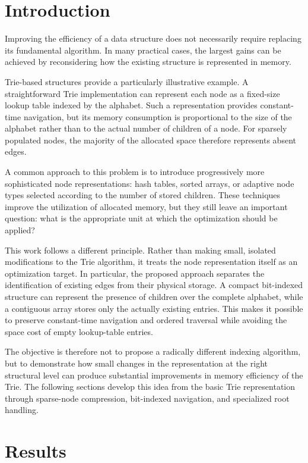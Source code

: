 \documentclass[pdflatex,sn-mathphys-num]{sn-jnl}%
\theoremstyle{thmstyleone}%
\theoremstyle{thmstyletwo}%
\theoremstyle{thmstylethree}%
\begin{document}
\section{Introduction}\label{sec1}


Improving the efficiency of a data structure does not necessarily require replacing its fundamental algorithm. In many practical cases, the largest gains can be achieved by reconsidering how the existing structure is represented in memory.

Trie-based structures provide a particularly illustrative example. A straightforward Trie implementation can represent each node as a fixed-size lookup table indexed by the alphabet. Such a representation provides constant-time navigation, but its memory consumption is proportional to the size of the alphabet rather than to the actual number of children of a node. For sparsely populated nodes, the majority of the allocated space therefore represents absent edges.

A common approach to this problem is to introduce progressively more sophisticated node representations: hash tables, sorted arrays, or adaptive node types selected according to the number of stored children. These techniques improve the utilization of allocated memory, but they still leave an important question: what is the appropriate unit at which the optimization should be applied?

This work follows a different principle. Rather than making small, isolated modifications to the Trie algorithm, it treats the node representation itself as an optimization target. In particular, the proposed approach separates the identification of existing edges from their physical storage. A compact bit-indexed structure can represent the presence of children over the complete alphabet, while a contiguous array stores only the actually existing entries. This makes it possible to preserve constant-time navigation and ordered traversal while avoiding the space cost of empty lookup-table entries.

The objective is therefore not to propose a radically different indexing algorithm, but to demonstrate how small changes in the representation at the right structural level can produce substantial improvements in memory efficiency of the Trie. The following sections develop this idea from the basic Trie representation through sparse-node compression, bit-indexed navigation, and specialized root handling.


\section{Results}\label{sec2}
\end{document}
